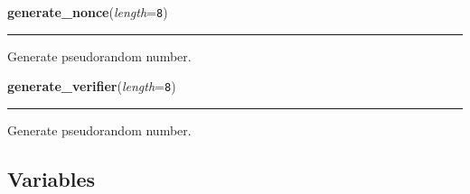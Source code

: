     \label{lib:oauth:generate_nonce}

    \vspace{0.5ex}

\hspace{.8\funcindent}\begin{boxedminipage}{\funcwidth}

    \raggedright \textbf{generate\_nonce}(\textit{length}={\tt 8})

    \vspace{-1.5ex}

    \rule{\textwidth}{0.5\fboxrule}
\setlength{\parskip}{2ex}
    Generate pseudorandom number.

\setlength{\parskip}{1ex}
    \end{boxedminipage}

    \label{lib:oauth:generate_verifier}

    \vspace{0.5ex}

\hspace{.8\funcindent}\begin{boxedminipage}{\funcwidth}

    \raggedright \textbf{generate\_verifier}(\textit{length}={\tt 8})

    \vspace{-1.5ex}

    \rule{\textwidth}{0.5\fboxrule}
\setlength{\parskip}{2ex}
    Generate pseudorandom number.

\setlength{\parskip}{1ex}
    \end{boxedminipage}



  \subsection{Variables}

